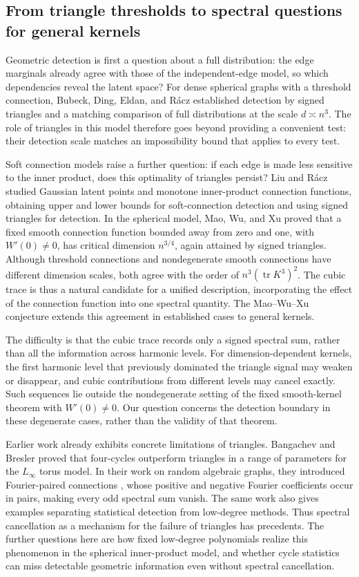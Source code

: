 \documentclass[11pt,reqno]{amsart}
\numberwithin{equation}{section}
\theoremstyle{definition}
\theoremstyle{remark}
\theoremstyle{definition}
\DeclareMathOperator{\tr}{tr}
\begin{document}
\subsection{From triangle thresholds to spectral questions for general kernels}
Geometric detection is first a question about a full distribution: the edge marginals already agree with those of the independent-edge model,
so which dependencies reveal the latent space?
For dense spherical graphs with a threshold connection, Bubeck, Ding, Eldan, and R\'acz \cite[Theorems 1(a), 1(c), and 2]{BDER}
established detection by signed triangles and a matching comparison of full distributions at the scale $d\asymp n^3$.
The role of triangles in this model therefore goes beyond providing a convenient test:
their detection scale matches an impossibility bound that applies to every test.

Soft connection models raise a further question: if each edge is made less sensitive to the inner product,
does this optimality of triangles persist?
Liu and R\'acz \cite{LRlatent} studied Gaussian latent points and monotone inner-product connection functions,
obtaining upper and lower bounds for soft-connection detection and using signed triangles for detection.
In the spherical model, Mao, Wu, and Xu \cite[Theorem 1]{MWX} proved that
a fixed smooth connection function bounded away from zero and one, with $W'(0)\ne0$, has critical dimension $n^{3/4}$,
again attained by signed triangles.
Although threshold connections and nondegenerate smooth connections have different dimension scales,
both agree with the order of $n^3(\tr K^3)^2$.
The cubic trace is thus a natural candidate for a unified description, incorporating the effect of the connection function into one spectral quantity.
The Mao--Wu--Xu conjecture extends this agreement in established cases to general kernels.

The difficulty is that the cubic trace records only a signed spectral sum, rather than all the information across harmonic levels.
For dimension-dependent kernels, the first harmonic level that previously dominated the triangle signal may weaken or disappear,
and cubic contributions from different levels may cancel exactly.
Such sequences lie outside the nondegenerate setting of the fixed smooth-kernel theorem with $W'(0)\ne0$.
Our question concerns the detection boundary in these degenerate cases, rather than the validity of that theorem.

Earlier work already exhibits concrete limitations of triangles.
Bangachev and Bresler \cite{BBcube} proved that four-cycles outperform triangles in a range of parameters for the $L_\infty$ torus model.
In their work on random algebraic graphs, they introduced Fourier-paired connections \cite{BBalgebra},
whose positive and negative Fourier coefficients occur in pairs, making every odd spectral sum vanish.
The same work also gives examples separating statistical detection from low-degree methods.
Thus spectral cancellation as a mechanism for the failure of triangles has precedents.
The further questions here are how fixed low-degree polynomials realize this phenomenon in the spherical inner-product model,
and whether cycle statistics can miss detectable geometric information even without spectral cancellation.
\end{document}
